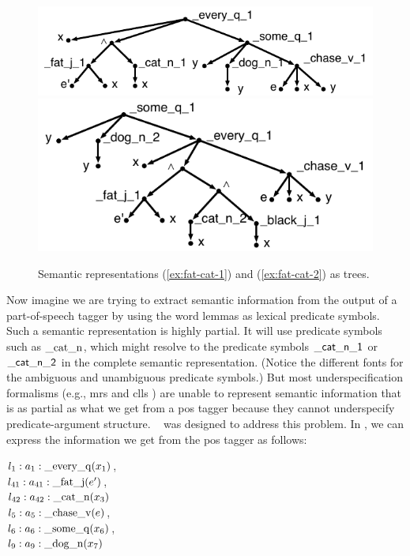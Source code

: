 \begin{figure}[t]
\centering
\includegraphics[scale=0.8]{pic-cat-chased-dog} \\
\includegraphics[scale=0.8]{pic-cat-chased-dog-2}
\caption{Semantic representations (\ref{ex:fat-cat-1}) and
  (\ref{ex:fat-cat-2}) as trees. \label{fig:1}}
\end{figure}


Now imagine we are trying to extract semantic information from the
output of a part-of-speech tagger by using the word lemmas as lexical
predicate symbols.  Such a semantic representation is highly partial.
It will use predicate symbols such as
$\mathrm{\_cat\_n}$, which might resolve to the predicate symbols
$\mathsf{\_cat\_n\_1}$ or $\mathsf{\_cat\_n\_2}$ in the complete semantic
representation.  (Notice the different fonts for the ambiguous and
unambiguous predicate symbols.)
But
most underspecification formalisms (e.g., {\sc mrs}
\cite{copestake:etal:2005} and {\sc clls} \cite{egg:etal:2001}) are
unable to represent semantic 
information that is as partial as what we get from a {\sc pos} tagger
because they cannot underspecify
predicate-argument structure.
\rmrs\ \cite{copestake:2007a} was
designed to address this problem.  In \rmrs, we can express the
information we get from the {\sc pos} tagger as follows:

\begin{examples}
\item \label{ex:cat-pos}
$l_1:a_1:\mathrm{\_every\_q}(x_1)$, \\
$l_{41}:a_{41}:\mathrm{\_fat\_j}(e')$,\\
$l_{42}:a_{42}:\mathrm{\_cat\_n}(x_3)$\\
$l_5:a_5:\mathrm{\_chase\_v}(e)$, \\
$l_6:a_6:\mathrm{\_some\_q}(x_6)$, \\
$l_9:a_9:\mathrm{\_dog\_n}(x_7)$
\end{examples}

